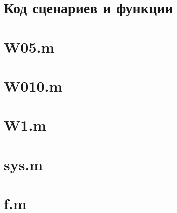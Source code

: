 \documentclass{article}
\begin{document}
	\section{Код сценариев и функции}
	\section*{W05.m}
	
	\section*{W010.m}
	
	\newpage
	\section*{W1.m}
	
	\newpage
	\section*{sys.m}
	
	\section*{f.m}
	
	
\end{document}
